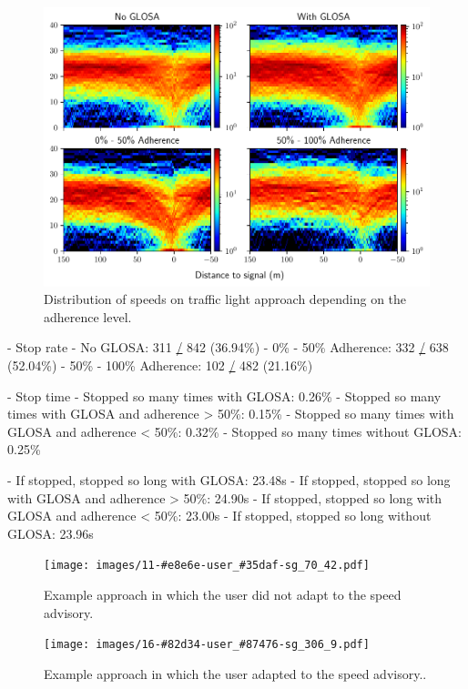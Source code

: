 \begin{figure}[t]
\caption{Distribution of speeds on traffic light approach depending on the adherence level.}\label{fig:impacts-approach-speed-heatmap}
\includegraphics[width=\linewidth]{images/impacts-approach-speed-heatmap.pdf}
\end{figure}

- Stop rate
- No GLOSA: 311 \href{https://file+.vscode-resource.vscode-cdn.net/}{/} 842 (36.94\%) 
- 0\% - 50\% Adherence: 332 \href{https://file+.vscode-resource.vscode-cdn.net/}{/} 638 (52.04\%) 
- 50\% - 100\% Adherence: 102 \href{https://file+.vscode-resource.vscode-cdn.net/}{/} 482 (21.16\%)

- Stop time
- Stopped so many times with GLOSA: 0.26\% 
- Stopped so many times with GLOSA and adherence > 50\%: 0.15\% 
- Stopped so many times with GLOSA and adherence < 50\%: 0.32\% 
- Stopped so many times without GLOSA: 0.25\% 

- If stopped, stopped so long with GLOSA: 23.48s 
- If stopped, stopped so long with GLOSA and adherence > 50\%: 24.90s 
- If stopped, stopped so long with GLOSA and adherence < 50\%: 23.00s 
- If stopped, stopped so long without GLOSA: 23.96s

\begin{figure}[t]
\caption{Example approach in which the user did not adapt to the speed advisory.}\label{fig:example-trajectory-not-adapted}
\texttt{[image: images/11-\#e8e6e-user\_\#35daf-sg\_70\_42.pdf]}
\end{figure}

\begin{figure}[t]
\caption{Example approach in which the user adapted to the speed advisory..}\label{fig:example-trajectory-adapted}
\texttt{[image: images/16-\#82d34-user\_\#87476-sg\_306\_9.pdf]}
\end{figure}

